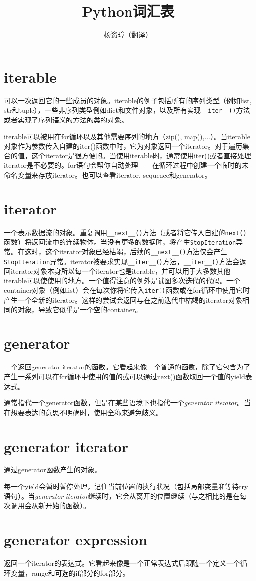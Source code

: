 \documentclass{ctexart}
\title{Python词汇表}
\author{杨资璋（翻译）}
\begin{document}
\maketitle
\section*{iterable}

可以一次返回它的一些成员的对象。iterable的例子包括所有的序列类型（例如list, str和tuple），一些非序列类型例如dict和文件对象，以及所有实现\lstinline{__iter__()}方法或者实现了序列语义的方法的类的对象。

iterable可以被用在for循环以及其他需要序列的地方（zip(), map(),...）。当iterable对象作为参数传入自建的iter()函数中时，它为对象返回一个iterator。对于遍历集合的值，这个iterator是很方便的。当使用iterable时，通常使用iter()或者直接处理iterator是不必要的。for语句会帮你自动处理——在循环过程中创建一个临时的未命名变量来存放iterator。也可以查看iterator, sequence和generator。

\section*{iterator}

一个表示数据流的对象。重复调用\lstinline{__next__()}方法（或者将它传入自建的\lstinline{next()}函数）将返回流中的连续物体。当没有更多的数据时，将产生\lstinline{StopIteration}异常。在这时，这个iterator对象已经枯竭，后续的\lstinline{__next__()}方法仅会产生\lstinline{StopIteration}异常。iterator被要求实现\lstinline{__iter__()}方法，\lstinline{__iter__()}方法会返回iterator对象本身所以每一个iterator也是iterable，并可以用于大多数其他iterable可以使使用的地方。一个值得注意的例外是试图多次迭代的代码。一个container对象（例如list）会在每次你将它传入\lstinline{iter()}函数或在for循环中使用它时产生一个全新的iterator。这样的尝试会返回与在之前迭代中枯竭的iterator对象相同的对象，导致它似乎是一个空的container。

\section*{generator}

一个返回generator iterator的函数。它看起来像一个普通的函数，除了它包含为了产生一系列可以在for循环中使用的值的或可以通过next()函数取回一个值的yield表达式。

通常指代一个generator函数，但是在某些语境下也指代一个\textit{generator iterator}。当在想要表达的意思不明确时，使用全称来避免歧义。

\section*{generator iterator}

通过generator函数产生的对象。

每一个yield会暂时暂停处理，记住当前位置的执行状况（包括局部变量和等待try语句）。当\textit{generator iterator}继续时，它会从离开的位置继续（与之相比的是在每次调用会从新开始的函数）。

\section*{generator expression}

返回一个iterator的表达式。它看起来像是一个正常表达式后跟随一个定义一个循环变量，range和可选的if部分的for部分。
\end{document}
